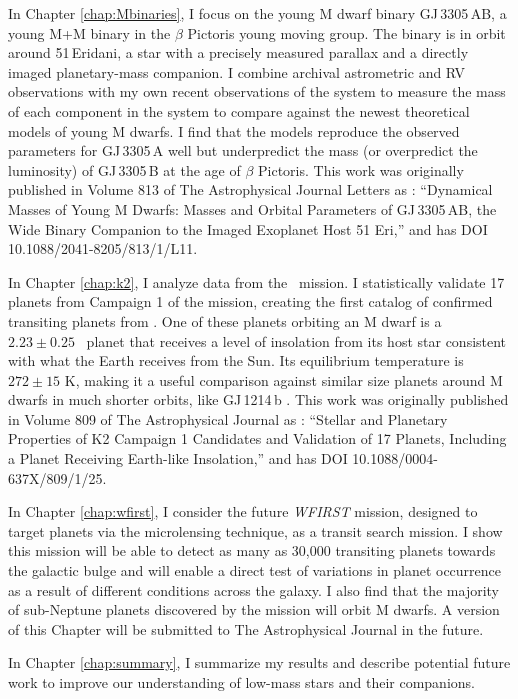 In Chapter \ref{chap:Mbinaries}, I focus on the young M dwarf binary 
GJ\,3305\,AB, a young M+M binary in the $\beta$ Pictoris young moving group.
The binary is in orbit around 51\,Eridani, a star with a precisely measured parallax and
a directly imaged planetary-mass companion.
I combine archival astrometric and RV observations with my own recent observations of the
system to measure the mass of each component in the system to compare against the newest
theoretical models of young M dwarfs. 
I find that the models reproduce the observed parameters for GJ\,3305\,A well but 
underpredict the mass (or overpredict the luminosity) of GJ\,3305\,B at the age of $\beta$ Pictoris.
This work was originally published in Volume 813 of The Astrophysical Journal Letters
as \citet{Montet15c}: ``Dynamical Masses of Young M Dwarfs: Masses and Orbital Parameters of GJ\,3305\,AB, the Wide Binary Companion to the Imaged Exoplanet Host 51 Eri,''
and has DOI 10.1088/2041-8205/813/1/L11.

In Chapter \ref{chap:k2}, I analyze data from the \KT\ mission.
I statistically validate 17 planets from Campaign 1 of the mission, creating the first
catalog of confirmed transiting planets from \KT.
One of these planets orbiting an M dwarf is a $2.23 \pm 0.25$ \rearth\ planet that receives
a level of insolation from its host star consistent with what the Earth receives from the
Sun. 
Its equilibrium temperature is $272 \pm 15$ K, making it a useful comparison 
against similar size planets around M dwarfs in much shorter orbits, like GJ\,1214\,b
\citep{Charbonneau09}.
This work was originally published in Volume 809 of The Astrophysical Journal
as \citet{Montet15b}: ``Stellar and Planetary Properties of K2 Campaign 1 Candidates and Validation of 17 Planets, Including a Planet Receiving Earth-like Insolation,'' and has DOI 10.1088/0004-637X/809/1/25.

In Chapter \ref{chap:wfirst}, I consider the future \textit{WFIRST} mission, designed to target planets via the microlensing technique, as a transit search mission. I show
this mission will be able to detect as many as 30,000 transiting planets towards the
galactic bulge and will enable a direct test of variations in planet occurrence 
as a result of different conditions across the galaxy. 
I also find that the majority of
sub-Neptune planets discovered by the mission will orbit M dwarfs. 
A version of this Chapter will be submitted
to The Astrophysical Journal in the future.

In Chapter \ref{chap:summary}, I summarize my results and describe potential
future work to improve our understanding of low-mass stars and their companions. 
